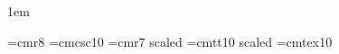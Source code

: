 

\let\amp=\&
\let\SS=\S
\let\PP=\P
\let\em=\it %

\newif\iftwoside\twosidefalse
\parskip 0pt %
\parindent 1em %

\font\eightrm=cmr8
\font\sc=cmcsc10
\let\mainfont=\tenrm
\font\titlefont=cmr7 scaled %
\font\ttitlefont=cmtt10 scaled %
\font\tentex=cmtex10 %
\let\idfont\it
\let\reservedfont\bf

\def\today{\ifcase\month\or
  January\or February\or March\or April\or May\or June\or
  July\or August\or September\or October\or November\or December\fi
  \space\number\day, \number\year}

\def\\#1{\leavevmode\hbox{\idfont#1\/\kern.05em}} %
\def\|#1{\leavevmode\hbox{$#1$}} %
\def\&#1{\leavevmode\hbox{\reservedfont#1\/}} %
\def\.#1{\leavevmode\hbox{\tentex %
  \let\\=\BS %
  \let\'=\RQ %
  \let\`=\LQ %
  \let\{=\LB %
  \let\}=\RB %
  \let\~=\TL %
  \let\ =\SP %
  \let\_=\UL %
  \let\&=\AM %
  #1}}
\def\#{\hbox{\tt\char`\#}} %
\def\${\hbox{\tt\char`\$}} %
\def\%{\hbox{\tt\char`\%}} %
\def\^{\ifmmode\mathchar"222 \else\char`^ \fi} %
\def\AT!{@} %
\def\@{@} %

\def\CD{\relax\ifmmode\let\DC\egroup\hbox\bgroup\else\let\DC\relax\fi}
\let\DC=\relax

